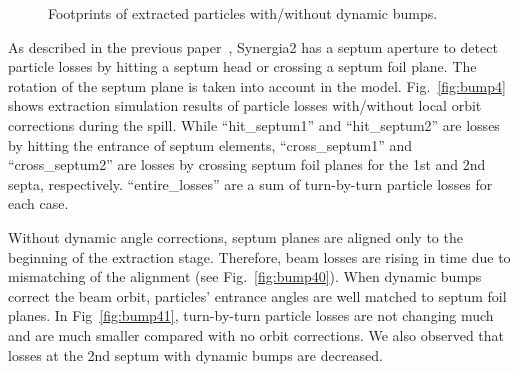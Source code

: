 \documentclass[aps,prstab,onecolumn,preprint,endfloats,11pt]{revtex4-1}
\begin{document}
\begin{figure}[!tbp]
  \caption{\label{fig:bump3}Footprints of extracted particles with/without dynamic bumps.}
\end{figure}

As described in the previous paper~\cite{mu2e}, Synergia2 has a septum aperture to detect particle losses by hitting a septum head or crossing a septum foil plane.
The rotation of the septum plane is taken into account in the model.
Fig.~\ref{fig:bump4} shows extraction simulation results of particle losses with/without local orbit corrections during the spill.
While ``hit\_septum1'' and ``hit\_septum2'' are losses by hitting the entrance of septum elements, ``cross\_septum1'' and ``cross\_septum2'' are losses by crossing septum foil planes for the 1st and 2nd septa, respectively.
``entire\_losses'' are a sum of turn-by-turn particle losses for each case.

Without dynamic angle corrections, septum planes are aligned only to the beginning of the extraction stage.
Therefore, beam losses are rising in time due to mismatching of the alignment (see Fig.~\ref{fig:bump40}).
When dynamic bumps correct the beam orbit, particles' entrance angles are well matched to septum foil planes.
In Fig~\ref{fig:bump41}, turn-by-turn particle losses are not changing much and are much smaller compared with no orbit corrections.
We also observed that losses at the 2nd septum with dynamic bumps are decreased.
\end{document}
